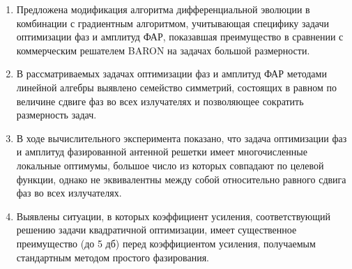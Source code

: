\begin{enumerate}
\item Предложена модификация алгоритма дифференциальной эволюции в комбинации с градиентным алгоритмом, учитывающая специфику задачи оптимизации фаз и амплитуд ФАР, показавшая преимущество в сравнении с коммерческим решателем BARON на задачах большой размерности.   
  \item В рассматриваемых задачах оптимизации фаз и амплитуд ФАР методами линейной алгебры выявлено семейство  симметрий, состоящих в равном по величине сдвиге фаз во всех излучателях и позволяющее сократить размерность задач.
  \item В ходе вычислительного эксперимента показано, что задача оптимизации фаз и амплитуд фазированной антенной решетки имеет многочисленные локальные оптимумы, большое число из которых совпадают по целевой функции, однако не эквивалентны между собой относительно равного сдвига фаз во всех излучателях.
  \item Выявлены ситуации, в которых коэффициент усиления, соответствующий решению задачи квадратичной оптимизации, имеет существенное преимущество (до 5 дб) перед коэффициентом усиления, получаемым стандартным методом простого фазирования. 
\end{enumerate}
